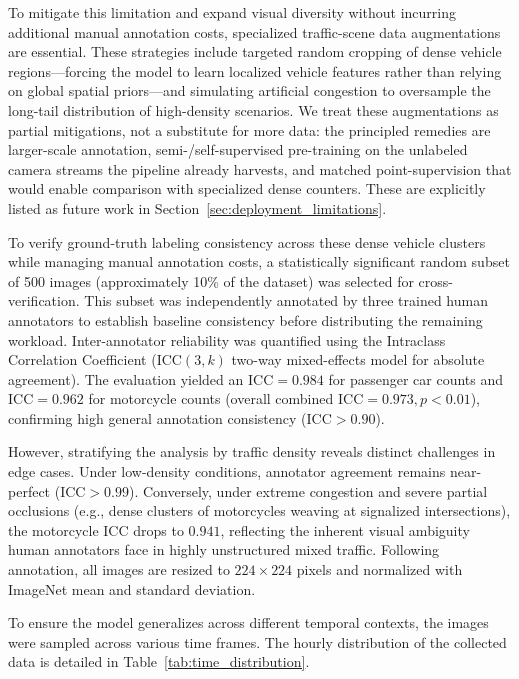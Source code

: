 \documentclass[journal,twocolumn]{IEEEtran}
\begin{document}
To mitigate this limitation and expand visual diversity without incurring additional manual annotation costs, specialized traffic-scene data augmentations are essential. These strategies include targeted random cropping of dense vehicle regions—forcing the model to learn localized vehicle features rather than relying on global spatial priors—and simulating artificial congestion to oversample the long-tail distribution of high-density scenarios. We treat these augmentations as partial mitigations, not a substitute for more data: the principled remedies are larger-scale annotation, semi-/self-supervised pre-training on the unlabeled camera streams the pipeline already harvests, and matched point-supervision that would enable comparison with specialized dense counters. These are explicitly listed as future work in Section~\ref{sec:deployment_limitations}.

To verify ground-truth labeling consistency across these dense vehicle clusters while managing manual annotation costs, a statistically significant random subset of 500 images (approximately 10\% of the dataset) was selected for cross-verification. This subset was independently annotated by three trained human annotators to establish baseline consistency before distributing the remaining workload. Inter-annotator reliability was quantified using the Intraclass Correlation Coefficient ($\text{ICC}(3,k)$ two-way mixed-effects model for absolute agreement). The evaluation yielded an $\text{ICC} = 0.984$ for passenger car counts and $\text{ICC} = 0.962$ for motorcycle counts (overall combined $\text{ICC} = 0.973, p < 0.01$), confirming high general annotation consistency ($\text{ICC} > 0.90$). 

However, stratifying the analysis by traffic density reveals distinct challenges in edge cases. Under low-density conditions, annotator agreement remains near-perfect ($\text{ICC} > 0.99$). Conversely, under extreme congestion and severe partial occlusions (e.g., dense clusters of motorcycles weaving at signalized intersections), the motorcycle ICC drops to $0.941$, reflecting the inherent visual ambiguity human annotators face in highly unstructured mixed traffic. Following annotation, all images are resized to $224 \times 224$ pixels and normalized with ImageNet mean and standard deviation.

To ensure the model generalizes across different temporal contexts, the images were sampled across various time frames. The hourly distribution of the collected data is detailed in Table~\ref{tab:time_distribution}.
\end{document}
